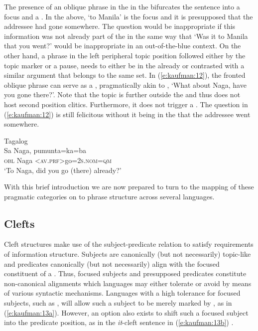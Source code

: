 \documentclass[output=paper]{langsci/langscibook}
\begin{document}
\noindent
The presence of an oblique phrase in the  in the  bifurcates the sentence into a focus and a . In the above, `to Manila' is the focus and it is presupposed that the addressee had gone somewhere. The question would be inappropriate if this information was not already part of the  in the same way that `Was it to Manila that you went?' would be inappropriate in an out-of-the-blue context. On the other hand, a phrase in the left peripheral topic position followed either by the topic marker or a pause, needs to either be in the  already or contrasted with a similar argument that belongs to the same set. In (\ref{e:kaufman:12}), the fronted oblique phrase can serve as a , pragmatically akin to , `What about Naga, have you gone there?'. Note that the topic is further outside the  and thus does not host second position clitics. Furthermore, it does not trigger a . The question in (\ref{e:kaufman:12}) is still felicitous without it being in the  that the addressee went somewhere.

\begin{exe}
	\ex\label{e:kaufman:12}{Tagalog}\\
	\gll {\ob}Sa Naga{\cb}, p{\USSmaller}um{\USGreater}unta=ka=ba{\USQMark}\\
	\phantom{[}\textsc{obl} Naga <\textsc{av.prf}>go=\textsc{2s.nom=qm}\\
	\glt `To Naga, did you go (there) already?'
\end{exe}

\noindent
With this brief introduction we are now prepared to turn to the mapping of these pragmatic categories on to phrase structure across several  languages. 

\subsection{\label{s:kaufman:2.3}Clefts}

Cleft structures make use of the subject-predicate relation to satisfy requirements of information structure. Subjects are canonically (but not necessarily) topic-like and predicates canonically (but not necessarily) align with the focused constituent of a . Thus, focused subjects and presupposed predicates constitute non-canonical alignments which languages may either tolerate or avoid by means of various syntactic mechanisms. Languages with a high tolerance for focused subjects, such as , will allow such a subject to be merely marked by , as in (\ref{e:kaufman:13a}). However, an option also exists to shift such a focused subject into the predicate position, as in the \textit{it}-cleft sentence in (\ref{e:kaufman:13b}) \citep{Lambrecht1994}. 
\end{document}
